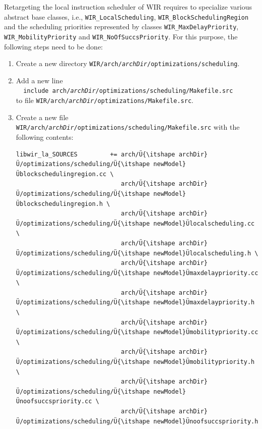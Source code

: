 Retargeting the local instruction scheduler of \gls{WIR} requires to specialize various abstract base classes, i.e., \texttt{WIR\_LocalScheduling}, \texttt{WIR\_BlockSchedulingRegion} and the scheduling priorities represented by classes \texttt{WIR\_MaxDelayPriority}, \texttt{WIR\_MobilityPriority} and \texttt{WIR\_NoOfSuccsPriority}.
For this purpose, the following steps need to be done:
\begin{enumerate}
  \item Create a new directory \texttt{WIR/arch/{\itshape archDir}/optimizations/scheduling}.

  \item Add a new line \\
  \verb|  include arch/|\texttt{\itshape archDir}\verb|/optimizations/scheduling/Makefile.src| \\
  to file \texttt{WIR/arch/{\itshape archDir}/optimizations/Makefile.src}.

  \item Create a new file \texttt{WIR/arch/{\itshape archDir}/optimizations/scheduling/Makefile.src} with the following contents: \\
\begin{lstlisting}[style=code,float=!ht,xleftmargin=10mm,aboveskip=-0.8 \baselineskip,belowskip=-0.8 \baselineskip]
libwir_la_SOURCES         += arch/Ü{\itshape archDir}Ü/optimizations/scheduling/Ü{\itshape newModel}Üblockschedulingregion.cc \
                             arch/Ü{\itshape archDir}Ü/optimizations/scheduling/Ü{\itshape newModel}Üblockschedulingregion.h \
                             arch/Ü{\itshape archDir}Ü/optimizations/scheduling/Ü{\itshape newModel}Ülocalscheduling.cc \
                             arch/Ü{\itshape archDir}Ü/optimizations/scheduling/Ü{\itshape newModel}Ülocalscheduling.h \
                             arch/Ü{\itshape archDir}Ü/optimizations/scheduling/Ü{\itshape newModel}Ümaxdelaypriority.cc \
                             arch/Ü{\itshape archDir}Ü/optimizations/scheduling/Ü{\itshape newModel}Ümaxdelaypriority.h \
                             arch/Ü{\itshape archDir}Ü/optimizations/scheduling/Ü{\itshape newModel}Ümobilitypriority.cc \
                             arch/Ü{\itshape archDir}Ü/optimizations/scheduling/Ü{\itshape newModel}Ümobilitypriority.h \
                             arch/Ü{\itshape archDir}Ü/optimizations/scheduling/Ü{\itshape newModel}Ünoofsuccspriority.cc \
                             arch/Ü{\itshape archDir}Ü/optimizations/scheduling/Ü{\itshape newModel}Ünoofsuccspriority.h


\end{lstlisting}
\end{enumerate}
